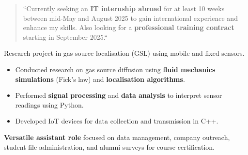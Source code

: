 \documentclass[10pt,a4paper,ragged2e,withhyper]{../AltaCV/altacv}
\begin{document}



\makecvheader



\begin{paracol}{2}

  \begin{quote}
    ``Currently seeking an \textbf{IT internship abroad} for at least 10 weeks between mid-May and August 2025 to gain international experience and enhance my skills.
    Also looking for a \textbf{professional training contract} starting in September 2025.``
  \end{quote}



  Research project in gas source localisation (GSL) using mobile and fixed sensors.
  
  \begin{itemize}
    \item Conducted research on gas source diffusion using \textbf{fluid mechanics simulations} (Fick's law) and \textbf{localisation algorithms}.
    \item Performed \textbf{signal processing} and \textbf{data analysis} to interpret sensor readings using Python.
    \item Developed IoT devices for data collection and transmission in C++.
  \end{itemize}

  \divider


  \textbf{Versatile assistant role} focused on data management, company outreach, student file administration, and alumni surveys for course certification.

  \divider



\end{paracol}
\end{document}
